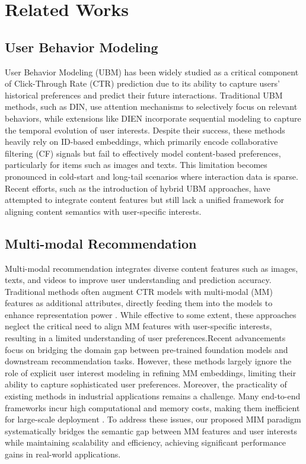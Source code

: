\section{Related Works}
\label{sec:Related Work}
\subsection{User Behavior Modeling}
User Behavior Modeling (UBM) has been widely studied as a critical component of Click-Through Rate (CTR) prediction due to its ability to capture users' historical preferences and predict their future interactions. Traditional UBM methods, such as DIN\cite{zhou2018deep}, use attention mechanisms to selectively focus on relevant behaviors, while extensions like DIEN\cite{zhou2019deep} incorporate sequential modeling to capture the temporal evolution of user interests. Despite their success, these methods heavily rely on ID-based embeddings, which primarily encode collaborative filtering (CF) signals but fail to effectively model content-based preferences, particularly for items such as images and texts. This limitation becomes pronounced in cold-start and long-tail scenarios where interaction data is sparse\cite{yuan2021One,yuan2020ParameterEfficient}. Recent efforts, such as the introduction of hybrid UBM approaches, have attempted to integrate content features but still lack a unified framework for aligning content semantics with user-specific interests.
\subsection{Multi-modal Recommendation}
Multi-modal recommendation integrates diverse content features such as images, texts, and videos to improve user understanding and prediction accuracy. Traditional methods often augment CTR models with multi-modal (MM) features as additional attributes, directly feeding them into the models to enhance representation power \cite{mo2015image}. While effective to some extent, these approaches neglect the critical need to align MM features with user-specific interests, resulting in a limited understanding of user preferences.Recent advancements focus on bridging the domain gap between pre-trained foundation models and downstream recommendation tasks\cite{yuan2023Where, wang2023missrec, wu2021empowering, liu2023Multimodal}. However, these methods largely ignore the role of explicit user interest modeling in refining MM embeddings, limiting their ability to capture sophisticated user preferences.
Moreover, the practicality of existing methods in industrial applications remains a challenge. Many end-to-end frameworks incur high computational and memory costs, making them inefficient for large-scale deployment \cite{yuan2023Where}. 
To address these issues, our proposed MIM paradigm systematically bridges the semantic gap between MM features and user interests while maintaining scalability and efficiency, achieving significant performance gains in real-world applications.


